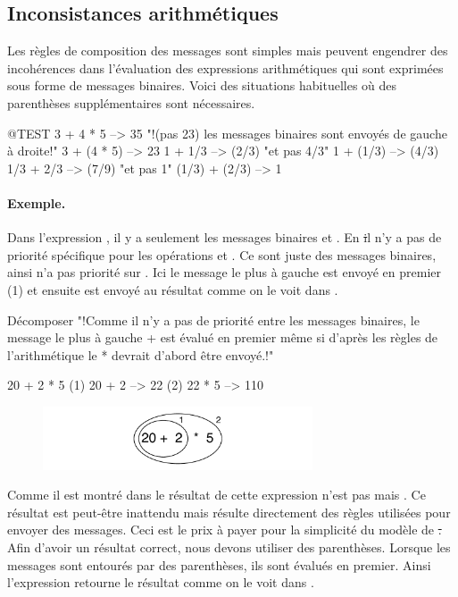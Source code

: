 \documentclass[a4paper,10pt,twoside]{book}
\begin{document}
\subsection{Inconsistances arithm\'etiques}
Les r\`egles de composition des messages sont simples mais peuvent engendrer des incoh\'erences dans l'\'evaluation des expressions arithm\'etiques qui sont exprim\'ees sous forme de messages binaires. Voici des situations habituelles o\`u des parenth\`eses suppl\'ementaires sont n\'ecessaires.

\begin{code}{@TEST}
3 + 4 * 5      --> 35    "!(pas 23)  les messages binaires sont envoy\'es de gauche \`a droite!"
3 + (4 * 5)    --> 23
1 + 1/3         --> (2/3)    "et pas 4/3"
1 + (1/3)       --> (4/3)
1/3 + 2/3       --> (7/9)    "et pas 1"
(1/3) + (2/3)  --> 1
\end{code}

\paragraph{Exemple.} 
Dans l'expression , il y a seulement les messages binaires \ct{+} et \ct{*}. En \st il n'y a pas de priorit\'e sp\'ecifique pour les op\'erations \ct{+} et \ct{*}. Ce sont juste des messages binaires, ainsi \ct{*} n'a pas priorit\'e sur \ct{+}. Ici le message le plus \`a gauche \ct{+} est envoy\'e en premier (1) et ensuite \ct{*} est envoy\'e au r\'esultat comme on le voit dans .  

\begin{example}[binaryMessages1]{D\'ecomposer }{}
"!Comme il n'y a pas de priorit\'e entre les messages binaires, le message le plus \`a gauche + est \'evalu\'e en premier m\^eme si d'apr\`es les r\`egles de l'arithm\'etique le * devrait d'abord \^etre envoy\'e.!"

      20 + 2 * 5 
(1)  20 + 2 --> 22
(2)  22       * 5 --> 110
\end{example}

\begin{figure}
\begin{center}\includegraphics[width=8cm]{ucompoNoBracketPar}\end{center}
\end{figure}
\noindent
Comme il est montr\'e dans  le r\'esultat de cette expression n'est pas  mais . Ce r\'esultat est peut-\^etre inattendu mais r\'esulte directement des r\`egles utilis\'ees pour envoyer des messages. Ceci est le prix \`a payer pour la simplicit\'e du mod\`ele de \st. Afin d'avoir un r\'esultat correct, nous devons utiliser des parenth\`eses. Lorsque les messages sont entour\'es par des parenth\`eses, ils sont \'evalu\'es en premier. Ainsi l'expression  retourne le r\'esultat comme on le voit dans .
\end{document}
